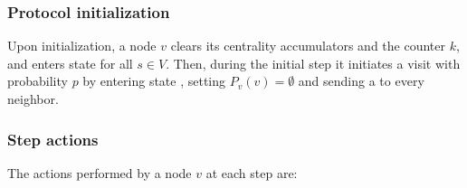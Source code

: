 \subsubsection{Protocol initialization}
Upon initialization, a node $v$ clears its centrality accumulators and the counter $k$, and enters state  for all $s \in V$. Then, during the initial step it initiates a visit with probability $p$ by entering state , setting $P_v(v) = \emptyset$ and sending a  to every neighbor.

\subsubsection{Step actions}
\label{multibfs:step}
The actions performed by a node $v$ at each step are:

